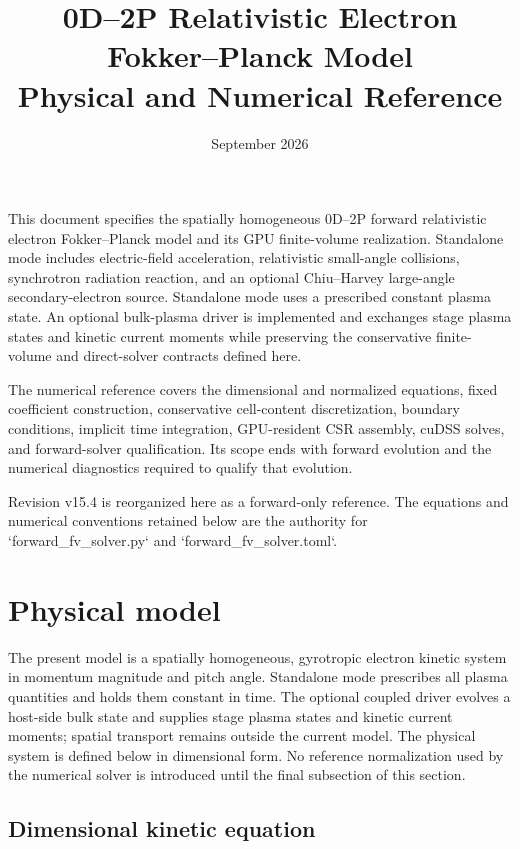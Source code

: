 \documentclass[11pt]{article}
\title{0D--2P Relativistic Electron Fokker--Planck Model\\Physical and Numerical Reference}
\author{}
\date{September 2026}
\begin{document}
\maketitle

\noindent
This document specifies the spatially homogeneous 0D--2P forward relativistic
electron Fokker--Planck model and its GPU finite-volume realization.  Standalone mode
includes electric-field acceleration, relativistic small-angle collisions,
synchrotron radiation reaction, and an optional Chiu--Harvey large-angle
secondary-electron source.  Standalone mode uses a prescribed constant plasma
state.  An optional bulk-plasma driver is implemented and exchanges stage plasma
states and kinetic current moments while preserving the conservative finite-volume
and direct-solver contracts defined here.

The numerical reference covers the dimensional and normalized equations, fixed
coefficient construction, conservative cell-content discretization, boundary
conditions, implicit time integration, GPU-resident CSR assembly, cuDSS solves,
and forward-solver qualification.  Its scope ends with forward evolution and
the numerical diagnostics required to qualify that evolution.

Revision v15.4 is reorganized here as a forward-only reference.  The equations
and numerical conventions retained below are the authority for
`forward_fv_solver.py` and `forward_fv_solver.toml`.

\section{Physical model}

The present model is a spatially homogeneous, gyrotropic electron kinetic system in
momentum magnitude and pitch angle.  Standalone mode prescribes all plasma quantities
and holds them constant in time.  The optional coupled driver evolves a host-side bulk
state and supplies stage plasma states and kinetic current moments; spatial transport
remains outside the current model.  The physical system is defined below in dimensional
form.  No reference normalization used by the numerical solver is introduced until the
final subsection of this section.

\subsection{Dimensional kinetic equation}
\end{document}
